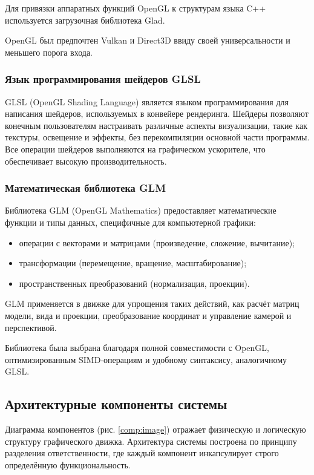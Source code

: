 Для привязки аппаратных функций OpenGL к структурам языка C++ используется загрузочная библиотека Glad.

OpenGL был предпочтен Vulkan и Direct3D ввиду своей универсальности и меньшего порога входа.

\subsubsection{Язык программирования шейдеров GLSL}

GLSL (OpenGL Shading Language) является языком программирования для написания шейдеров, используемых в конвейере рендеринга. Шейдеры позволяют конечным пользователям настраивать различные аспекты визуализации, такие как текстуры, освещение и эффекты, без перекомпиляции основной части программы. Все операции шейдеров выполняются на графическом ускорителе, что обеспечивает высокую производительность.

\subsubsection{Математическая библиотека GLM}

Библиотека GLM (OpenGL Mathematics) предоставляет математические функции и типы данных, специфичные для компьютерной графики:

\begin{itemize}
    \item операции с векторами и матрицами (произведение, сложение, вычитание);
    \item трансформации (перемещение, вращение, масштабирование);
    \item пространственных преобразований (нормализация, проекции).
\end{itemize}

GLM применяется в движке для упрощения таких действий, как расчёт матриц модели, вида и проекции, преобразование координат и управление камерой и перспективой.

Библиотека была выбрана благодаря полной совместимости с OpenGL, оптимизированным SIMD-операциям и удобному синтаксису, аналогичному GLSL.

\subsection{Архитектурные компоненты системы}

Диаграмма компонентов (рис. \ref{comp:image}) отражает физическую и логическую структуру графического движка. Архитектура системы построена по принципу разделения ответственности, где каждый компонент инкапсулирует строго определённую функциональность.

